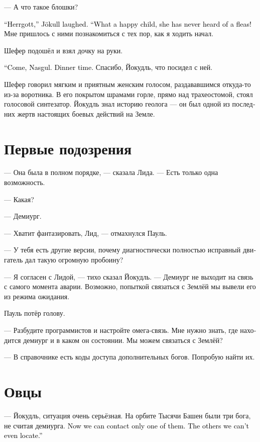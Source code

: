 \documentclass[a4paper,12pt,fleqn]{book}\usepackage{cooltooltips}\usepackage{polyglossia}\setdefaultlanguage[babelshorthands=true]{russian}\setotherlanguage{english}\defaultfontfeatures{Ligatures=TeX,Mapping=tex-text} \usepackage{xcolor}\definecolor{lightgray}{HTML}{bbbbbb}\color{lightgray}\newcommand{\ml}[3]{\textenglish{\textcolor{black}{#3}}}
\begin{document}
--- А что такое блошки?

\ml{$0$}
{--- Господь, --- Йокудль засмеялся.}
{``Herrgott,'' Jökull laughed.}
\ml{$0$}
{--- Счастливое дитя, не знает, что такое блошки!}
{``What a happy child, she has never heard of a fleas!}
Мне пришлось с ними познакомиться с тех пор, как я ходить начал.

Шефер подошёл и взял дочку на руки.

\ml{$0$}
{--- Пойдём, Назгуль.}
{``Come, Nasgul.}
\ml{$0$}
{Время обеда.}
{Dinner time.}
Спасибо, Йокудль, что посидел с ней.

Шефер говорил мягким и приятным женским голосом, раздававшимся откуда-то из-за воротника.
В его покрытом шрамами горле, прямо над трахеостомой, стоял голосовой синтезатор.
Йокудль знал историю геолога --- он был одной из последних жертв настоящих боевых действий на Земле.

\section{Первые подозрения}

--- Она была в полном порядке, --- сказала Лида.
--- Есть только одна возможность.

--- Какая?

--- Демиург.

--- Хватит фантазировать, Лид, --- отмахнулся Пауль.

--- У тебя есть другие версии, почему диагностически полностью исправный двигатель дал такую огромную пробоину?

--- Я согласен с Лидой, --- тихо сказал Йокудль.
--- Демиург не выходит на связь с самого момента аварии.
Возможно, попыткой связаться с Землёй мы вывели его из режима ожидания.

Пауль потёр голову.

--- Разбудите программистов и настройте омега-связь.
Мне нужно знать, где находится демиург и в каком он состоянии.
Мы можем связаться с Землёй?

--- В справочнике есть коды доступа дополнительных богов.
Попробую найти их.

\section{Овцы}

--- Йокудль, ситуация очень серьёзная.
На орбите Тысячи Башен были три бога, не считая демиурга.
\ml{$0$}
{Сейчас на связь выходит один.}
{Now we can contact only one of them.}
\ml{$0$}
{Прочих мы даже не можем локализовать.}
{The others we can't even locate.''}
\end{document}
